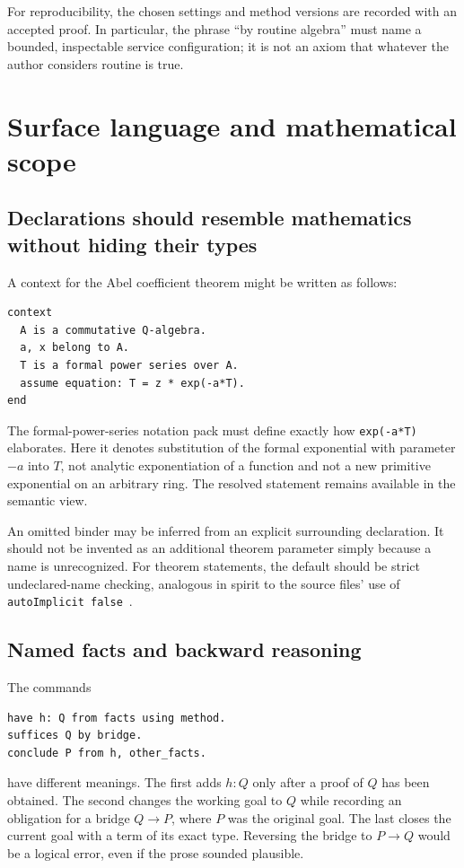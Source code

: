 \documentclass[11pt,a4paper]{article}
\newcommand{\code}[1]{\texttt{#1}}
\theoremstyle{remark}
\begin{document}
For reproducibility, the chosen settings and method versions are recorded with an accepted proof. In particular, the phrase ``by routine algebra'' must name a bounded, inspectable service configuration; it is not an axiom that whatever the author considers routine is true.

\section{Surface language and mathematical scope}
\label{sec:surface}

\subsection{Declarations should resemble mathematics without hiding their types}

A context for the Abel coefficient theorem might be written as follows:
\begin{lstlisting}
context
  A is a commutative Q-algebra.
  a, x belong to A.
  T is a formal power series over A.
  assume equation: T = z * exp(-a*T).
end
\end{lstlisting}
The formal-power-series notation pack must define exactly how \code{exp(-a*T)} elaborates. Here it denotes substitution of the formal exponential with parameter $-a$ into $T$, not analytic exponentiation of a function and not a new primitive exponential on an arbitrary ring. The resolved statement remains available in the semantic view.

An omitted binder may be inferred from an explicit surrounding declaration. It should not be invented as an additional theorem parameter simply because a name is unrecognized. For theorem statements, the default should be strict undeclared-name checking, analogous in spirit to the source files' use of \code{autoImplicit false}~\cite{proveit-abel,proveit-stirling}.

\subsection{Named facts and backward reasoning}

The commands
\begin{lstlisting}
have h: Q from facts using method.
suffices Q by bridge.
conclude P from h, other_facts.
\end{lstlisting}
have different meanings. The first adds $h:Q$ only after a proof of $Q$ has been obtained. The second changes the working goal to $Q$ while recording an obligation for a bridge $Q\to P$, where $P$ was the original goal. The last closes the current goal with a term of its exact type. Reversing the bridge to $P\to Q$ would be a logical error, even if the prose sounded plausible.
\end{document}
